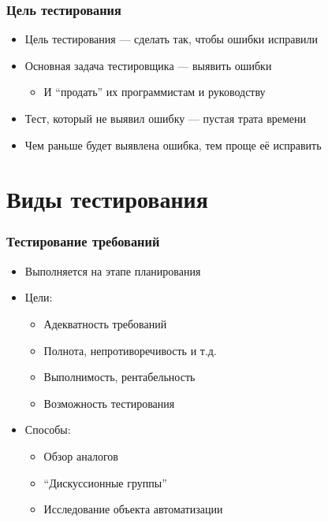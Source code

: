\documentclass[xetex,mathserif,serif]{beamer}
\begin{document}
	\begin{frame}
		\frametitle{Цель тестирования}
		\begin{itemize}
			\item Цель тестирования --- сделать так, чтобы ошибки исправили
			\item Основная задача тестировщика --- выявить ошибки
			\begin{itemize}
				\item И ``продать'' их программистам и руководству
			\end{itemize}
			\item Тест, который не выявил ошибку --- пустая трата времени
			\item Чем раньше будет выявлена ошибка, тем проще её исправить
		\end{itemize}
	\end{frame}

	\section{Виды тестирования}

	\begin{frame}
		\frametitle{Тестирование требований}
		\begin{itemize}
			\item Выполняется на этапе планирования
			\item Цели:
			\begin{itemize}
				\item Адекватность требований
				\item Полнота, непротиворечивость и т.д.
				\item Выполнимость, рентабельность
				\item Возможность тестирования
			\end{itemize}
			\item Способы:
			\begin{itemize}
				\item Обзор аналогов
				\item ``Дискуссионные группы''
				\item Исследование объекта автоматизации
			\end{itemize}
		\end{itemize}
	\end{frame}
\end{document}

